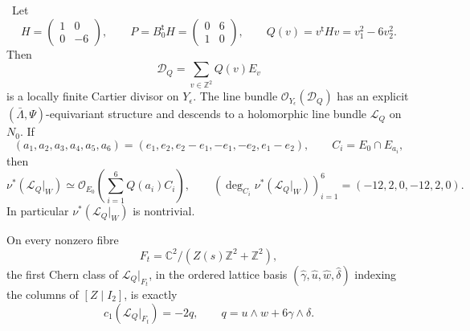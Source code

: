 \begin{proposition}
\label{prop:local-cusp-picard-obstruction}
\Verified\ Let
\[
 H=\begin{pmatrix}1&0\\0&-6\end{pmatrix},
 \qquad
 P=B_0^{\mathsf t}H=\begin{pmatrix}0&6\\1&0\end{pmatrix},
 \qquad
 Q(v)=v^{\mathsf t}Hv=v_1^2-6v_2^2.
\tag{5.17x}
\]
Then
\[
 \mathcal D_Q=\sum_{v\in\mathbb Z^2}Q(v)E_v
\tag{5.17y}
\]
is a locally finite Cartier divisor on \(Y_\epsilon\).
The line bundle \(\mathcal O_{Y_\epsilon}(\mathcal D_Q)\) has an explicit
\((\bar\Lambda,\Psi)\)-equivariant structure and descends to a holomorphic
line bundle \(\mathcal L_Q\) on \(N_0\).  If
\[
 (a_1,a_2,a_3,a_4,a_5,a_6)
 =(e_1,e_2,e_2-e_1,-e_1,-e_2,e_1-e_2),
 \qquad C_i=E_0\cap E_{a_i},
\]
then
\[
 \nu^*(\mathcal L_Q|_W)
 \simeq
 \mathcal O_{E_0}\!\left(\sum_{i=1}^6Q(a_i)C_i\right),
\qquad
 \left(\deg_{C_i}\nu^*(\mathcal L_Q|_W)\right)_{i=1}^6
 =(-12,2,0,-12,2,0).
\tag{5.17z}
\]
In particular \(\nu^*(\mathcal L_Q|_W)\) is nontrivial.

On every nonzero fibre
\[
 F_t=\mathbb C^2/(Z(s)\mathbb Z^2+\mathbb Z^2),
\]
the first Chern class of \(\mathcal L_Q|_{F_t}\), in the ordered lattice
basis
\((\widehat\gamma,\widehat u,\widehat w,\widehat\delta)\) indexing the
columns of \([Z\mid I_2]\), is exactly
\[
 c_1(\mathcal L_Q|_{F_t})=-2q,
 \qquad
 q=u\wedge w+6\gamma\wedge\delta.
\tag{5.17aa}
\]
\end{proposition}

